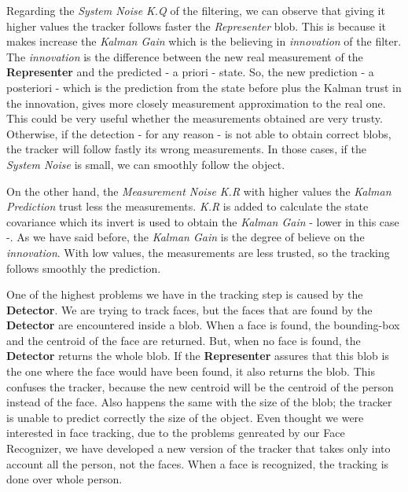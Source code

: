 Regarding the \textit{System Noise} \textit{K.Q} of the filtering, we can observe that giving it higher values the tracker follows faster the \textit{Representer} blob. This is because it makes increase the \textit{Kalman Gain} which is the believing in \textit{innovation} of the filter. The \textit{innovation} is the difference between the new real measurement of the \textbf{Representer} and the predicted - a priori - state. So, the new prediction - a posteriori - which is the prediction from the state before plus the Kalman trust in the innovation, gives more closely measurement approximation to the real one. This could be very useful whether the measurements obtained are very trusty. Otherwise, if the detection - for any reason - is not able to obtain correct blobs, the tracker will follow fastly its wrong measurements. In those cases, if the \textit{System Noise} is small, we can smoothly follow the object.

On the other hand, the \textit{Measurement Noise K.R} with higher values the \textit{Kalman Prediction} trust less the measurements. \textit{K.R} is added to calculate the state covariance which its invert is used to obtain the \textit{Kalman Gain} - lower in this case -. As we have said before, the \textit{Kalman Gain} is the degree of believe on the \textit{innovation}. With low values, the measurements are less trusted, so the tracking follows smoothly the prediction. 

One of the highest problems we have in the tracking step is caused by the \textbf{Detector}. We are trying to track faces, but the faces that are found by the \textbf{Detector} are encountered inside a blob. When a face is found, the bounding-box and the centroid of the face are returned. But, when no face is found, the \textbf{Detector} returns the whole blob. If the \textbf{Representer} assures that this blob is the one where the face would have been found, it also returns the blob. This confuses the tracker, because the new centroid will be the centroid of the person instead of the face. Also happens the same with the size of the blob; the tracker is unable to predict correctly the size of the object. Even thought we were interested in face tracking, due to the problems genreated by our Face Recognizer, we have developed a new version of the tracker that takes only into account all the person, not the faces. When a face is recognized, the tracking is done over whole person.
%
